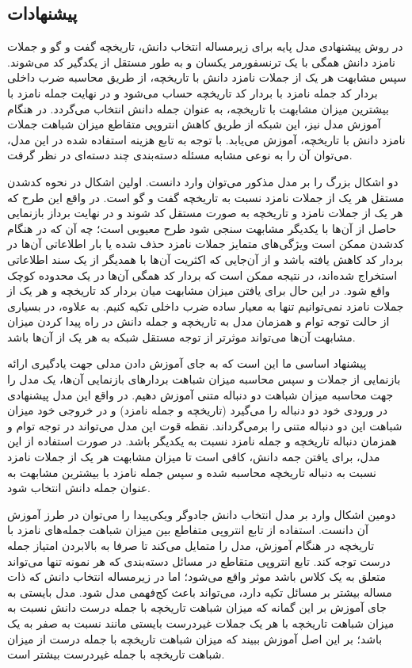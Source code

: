 \subsection{پیشنهادات} \label{chap4:solution:recom}

در روش پیشنهادی مدل پایه برای زیرمساله انتخاب دانش، تاریخچه گفت و گو و جملات نامزد دانش همگی با یک ترنسفورمر یکسان و به طور مستقل از یکدگیر کد می‌شوند. سپس مشابهت هر یک از جملات نامزد دانش با تاریخچه، از طریق محاسبه ضرب داخلی بردار کد جمله نامزد با بردار کد تاریخچه حساب می‌‌شود و در نهایت
جمله نامزد با بیشترین میزان مشابهت با تاریخچه، به عنوان جمله دانش انتخاب می‌گردد. در هنگام آموزش مدل نیز،‌ این شبکه از طریق کاهش انتروپی متقاطع میزان شباهت جملات نامزد دانش با تاریخچه، آموزش می‌یابد. با توجه به تابع هزینه استفاده شده در این مدل، می‌توان آن را به نوعی مشابه مسئله دسته‌بندی چند دسته‌ای در نظر گرفت. 

دو اشکال بزرگ را بر مدل مذکور می‌توان وارد دانست. اولین اشکال در نحوه کد‌شدن مستقل هر یک از جملات نامزد نسبت به تاریخچه گفت و گو است. در واقع این طرح که هر یک از جملات نامزد و تاریخچه به صورت مستقل کد شوند و در نهایت برداز بازنمایی حاصل از آن‌ها با یکدیگر مشابهت سنجی شود طرح معیوبی است؛ چه آن که در هنگام کدشدن ممکن است ويژگی‌های متمایز جملات نامزد حذف شده یا بار اطلاعاتی آن‌ها در بردار کد کاهش یافته باشد و از آن‌جایی که اکثریت آن‌ها با همدیگر از یک سند اطلاعاتی استخراج شده‌اند، در نتیجه ممکن است که بردار کد همگی‌ آن‌ها در یک محدوده کوچک واقع شود. در این حال برای یافتن میزان مشابهت میان بردار کد تاریخچه و هر یک از جملات نامزد نمی‌توانیم تنها به معیار ساده ضرب داخلی تکیه کنیم. به علاوه، در بسیاری از حالت توجه توام و همزمان مدل به تاریخچه و جمله دانش در راه پیدا کردن میزان مشابهت آن‌ها می‌تواند موثرتر از توجه مستقل شبکه به هر یک از آن‌ها باشد. 

پیشنهاد اساسی ما این است که به جای آموزش دادن مدلی جهت یادگیری ارائه بازنمایی از جملات و سپس محاسبه میزان شباهت بردار‌های بازنمایی آن‌ها، یک مدل را جهت محاسبه میزان شباهت دو دنباله متنی آموزش دهیم. در واقع این مدل پیشنهادی در ورودی خود دو دنباله را می‌گیرد (تاریخچه و جمله نامزد) و در خروجی خود میزان شباهت این دو دنباله متنی را برمی‌گرداند. نقطه قوت این مدل می‌تواند در توجه توام و همزمان دنباله تاریخچه و جمله نامزد نسبت به یکدیگر باشد. در صورت استفاده از این مدل، برای یافتن جمه دانش، کافی است تا میزان مشابهت هر یک از جملات نامزد نسبت به دنباله تاریخچه محاسبه شده و سپس جمله‌ نامزد با بیشترین مشابهت به عنوان جمله دانش انتخاب شود. 

دومین اشکال وارد بر مدل انتخاب دانش جادوگر ویکی‌پیدا را می‌توان در طرز آموزش آن دانست. استفاده از تابع انتروپی متفاطع بین میزان شباهت جمله‌های نامزد با تاریخچه در هنگام آموزش، مدل را متمایل می‌کند تا صرفا به بالابردن امتیاز جمله درست توجه کند. تابع انتروپی متقاطع در مسائل دسته‌بندی که هر نمونه تنها می‌تواند متعلق به یک کلاس باشد موثر واقع می‌شود؛ اما در زیرمساله انتخاب دانش که ذات مساله بیشتر بر مسائل
تکیه دارد، می‌تواند باعث کج‌فهمی مدل شود. مدل بایستی به جای آموزش بر این گمانه که میزان شباهت تاریخچه با جمله درست دانش نسبت به میزان شباهت تاریخچه با هر یک جملات غیردرست بایستی مانند نسبت به صفر به یک باشد؛ بر این اصل آموزش ببیند که میزان شباهت تاریخچه با جمله درست از میزان شباهت تاریخچه با جمله غیردرست بیشتر است. 

